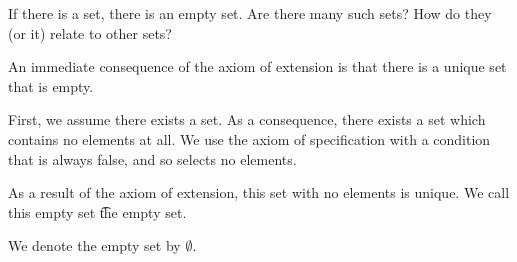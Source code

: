 

If there is a set, there is an empty set.
Are there many such sets?
How do they (or it) relate to other sets?


An immediate consequence of the axiom of extension is that there is a unique set that is empty.

\begin{account}
\end{account}


First, we assume there exists a set.
As a consequence, there exists a set which contains no elements at all.
We use the axiom of specification with a condition that is always false, and so selects no elements.

As a result of the axiom of extension, this set with no elements is unique.
We call this empty set \t{the empty set.}


We denote the empty set by $\emptyset$.
